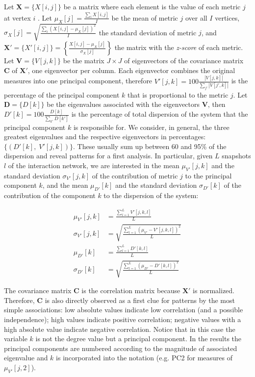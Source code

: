 \documentclass[%
aip,
jmp,%
amsmath,amssymb,
reprint,%
]{revtex4-1}
\begin{document}
Let $\mathbf{X}=\{X[i,j]\}$ be a matrix where each element is the value
of each metric $j$ at vertex $i$ .
Let
$\mu_X [j]=\frac{\sum_i X[i,j]}{I}$ be the mean of metric $j$ over all $I$ vertices, 
$\sigma_X [j]=\sqrt{\frac{\sum_i (X[i,j]-\mu_X [j])^2}{I}}$ the standard deviation of metric $j$,
and $\mathbf{X'}=\{X'[i,j]\}=\left\{\frac{X[i,j]-\mu_X[j]}{\sigma_X[j]}\right\}$ 
the matrix with the \emph{z-score} of each metric. 
Let $\mathbf{V}=\{V[j,k]\}$ be the matrix $J\times J$ of eigenvectors
of the covariance matrix $\mathbf{C}$
of $\mathbf{X'}$, one eigenvector per column.
Each eigenvector combines the original measures into one principal component, therefore
$V'[j,k]=100\frac{|V[j,k]|}{\sum_{j'} |V[j',k]|}$
is the percentage of the principal component $k$
that is proportional to the metric $j$.
Let $\mathbf{D}=\{D[k]\}$ be the eigenvalues associated with the eigenvectors $\mathbf{V}$,
then $D'[k]=100\frac{D[k]}{\sum_{k'}D[k']}$
is the percentage of total dispersion of the system that the principal component $k$
is responsible for.
We consider, in general, the three greatest eigenvalues and
the respective eigenvectors in percentages:
$\{(D'[k],\;V'[j,k])\}$.
These usually sum up between 60 and 95\% of the dispersion
and reveal patterns for a first analysis.
In particular, 
given $L$ snapshots $l$ of the interaction network,
we are interested in the mean
$\mu_{V'}[j,k]$
and the standard deviation $\sigma_{V'}[j,k]$ 
of the contribution of metric $j$ to the principal component $k$,
and the mean
$\mu_{D'}[k]$
and the standard deviation 
$\sigma_{D'}[k]$
of the contribution of the component $k$ to the dispersion
of the system:

\begin{align}\label{eq:pca}
\mu_{V'}[j,k]   &=\frac{\sum_{l=1}^L V'[j,k,l]}{L}\nonumber\\
\sigma_{V'}[j,k]&=\sqrt{\frac{\sum_{l=1}^L (\mu_{V'}-V'[j,k,l])^2}{L}}\\\nonumber
\mu_{D'}[k]&=\frac{\sum_{l=1}^L D'[k,l]}{L}\\\nonumber
\sigma_{D'}[k]&=\sqrt{\frac{\sum_{l=1}^L (\mu_{D'}-D'[k,l])^2}{L}}
\end{align}

The covariance matrix 
$\mathbf{C}$ is the correlation matrix because $\mathbf{X'}$ is normalized.
Therefore, $\mathbf{C}$ is also directly observed as a first clue for patterns
by the most simple associations:
low absolute values indicate low correlation (and a possible independence);
high values indicate positive correlation;
negative values with a high absolute value indicate negative correlation.
Notice that in this case the variable $k$ is not the degree value
but a principal component.
In the results the principal components are numbered
according to the magnitude of associated eigenvalue and $k$ is incorporated into
the notation (e.g. PC2 for measures of $\mu_{V'}[j,2]$).
\end{document}
